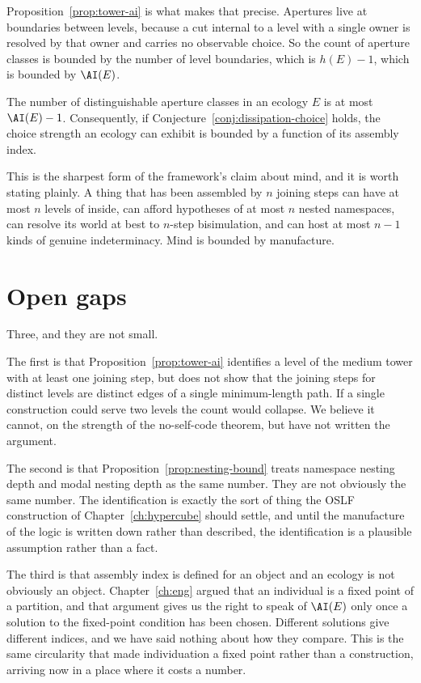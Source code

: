 Proposition~\ref{prop:tower-ai} is what makes that precise.
Apertures live at boundaries between levels, because a cut internal to a
level with a single owner is resolved by that owner and carries no
observable choice.
So the count of aperture classes is bounded by the number of level
boundaries, which is $h(E) - 1$, which is bounded by $\AI(E)$.

\begin{corollary}
\label{cor:ai-choice}
The number of distinguishable aperture classes in an ecology $E$ is at
most $\AI(E) - 1$.
Consequently, if Conjecture~\ref{conj:dissipation-choice} holds, the
choice strength an ecology can exhibit is bounded by a function of its
assembly index.
\end{corollary}

This is the sharpest form of the framework's claim about mind, and it is
worth stating plainly.
A thing that has been assembled by $n$ joining steps can have at most $n$
levels of inside, can afford hypotheses of at most $n$ nested
namespaces, can resolve its world at best to $n$-step bisimulation, and
can host at most $n-1$ kinds of genuine indeterminacy.
Mind is bounded by manufacture.

\section{Open gaps}

Three, and they are not small.

The first is that Proposition~\ref{prop:tower-ai} identifies a level of
the medium tower with at least one joining step, but does not show that
the joining steps for distinct levels are distinct edges of a single
minimum-length path.
If a single construction could serve two levels the count would collapse.
We believe it cannot, on the strength of the no-self-code theorem, but
have not written the argument.

The second is that Proposition~\ref{prop:nesting-bound} treats namespace
nesting depth and modal nesting depth as the same number.
They are not obviously the same number.
The identification is exactly the sort of thing the OSLF construction of
Chapter~\ref{ch:hypercube} should settle, and until the manufacture of
the logic is written down rather than described, the identification is a
plausible assumption rather than a fact.

The third is that assembly index is defined for an object and an ecology
is not obviously an object.
Chapter~\ref{ch:eng} argued that an individual is a fixed point of a
partition, and that argument gives us the right to speak of $\AI(E)$ only
once a solution to the fixed-point condition has been chosen.
Different solutions give different indices, and we have said nothing
about how they compare.
This is the same circularity that made individuation a fixed point rather
than a construction, arriving now in a place where it costs a number.

